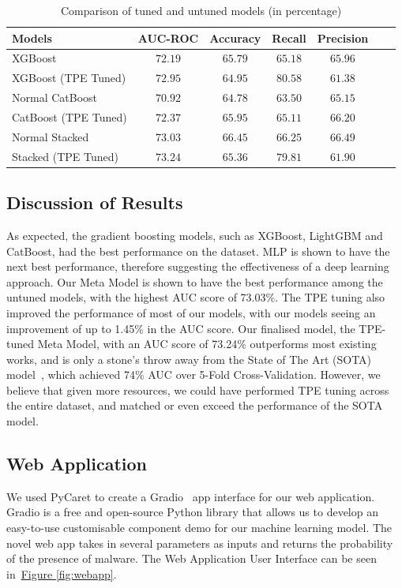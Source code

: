 \documentclass[pdflatex,sn-basic,Numbered]{sn-jnl}%
\theoremstyle{thmstyleone}%
\theoremstyle{thmstyletwo}%
\theoremstyle{thmstylethree}%
\newcommand{\reffig}[1]{\hyperref[#1]{Figure \ref*{#1}}}
\begin{document}
\begin{table}[ht]
\centering
\caption{Comparison of tuned and untuned models (in percentage)}
\label{tab:hypertuning}
\begin{tabular}{@{}lcccccc@{}}
\toprule
 \textbf{Models} & \textbf{AUC-ROC} & \textbf{Accuracy} & \textbf{Recall}  & \textbf{Precision} \\ \midrule
XGBoost & $72.19$ & $65.79$ & $65.18$ & $65.96$ \\ %
 XGBoost (TPE Tuned) & $72.95$ & $64.95$ & $\mathbf{80.58}$ & $61.38$ \\ \hline
Normal CatBoost & $70.92$ & $64.78$ & $63.50$ & $65.15$ \\ %
 CatBoost (TPE Tuned) & $72.37$ & $65.95$ & $65.11$ & $66.20$ \\ \hline
 Normal Stacked & $73.03$ & $\mathbf{66.45}$ & $66.25$ & $\mathbf{66.49}$ \\ %
 Stacked (TPE Tuned) & $\mathbf{73.24}$ & $65.36$ & $79.81$ & $61.90$ \\ \bottomrule %
\end{tabular}%
\vspace{-2ex}
\end{table}


\subsection{Discussion of Results}\label{subsec:discussion-of-results}
As expected, the gradient boosting models, such as XGBoost, LightGBM and CatBoost, had the best performance on the dataset.
MLP is shown to have the next best performance, therefore suggesting the effectiveness of a deep learning approach.
Our Meta Model is shown to have the best performance among the untuned models, with the highest AUC score of 73.03\%.
The TPE tuning also improved the performance of most of our models, with our models seeing an improvement of up to 1.45\% in the AUC score.
Our finalised model, the TPE-tuned Meta Model, with an AUC score of 73.24\% outperforms most existing works, and is only a stone's throw away from the State of The Art (SOTA) model~\cite{shahini2019}, which achieved 74\% AUC over 5-Fold Cross-Validation.
However, we believe that given more resources, we could have performed TPE tuning across the entire dataset, and matched or even exceed the performance of the SOTA model.

\subsection{Web Application}\label{subsec:web-application}
We used PyCaret to create a Gradio~\cite{gradio} app interface for our web application.
Gradio is a free and open-source Python library that allows us to develop an easy-to-use customisable component demo for our machine learning model.
The novel web app takes in several parameters as inputs and returns the probability of the presence of malware.
The Web Application User Interface can be seen in~\reffig{fig:webapp}.
\end{document}
